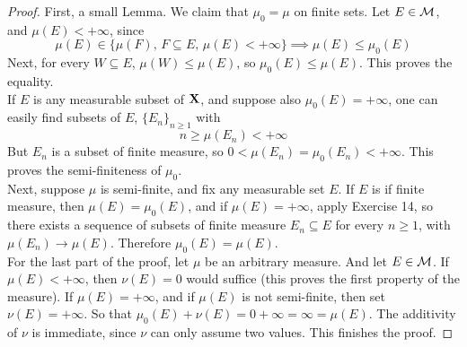 \documentclass[../../main.tex]{subfiles}
\begin{document}
\begin{proof}
First, a small Lemma. We claim that $\mu_0 = \mu$ on finite sets. Let $E\in\mathcal{M}$, and $\mu(E)<+\infty$, since \[\mu(E)\in\{\mu(F),\, F\subseteq E,\,\mu(E)<+\infty\}\implies \mu(E)\leq \mu_0(E)\]
Next, for every $W\subseteq E$, $\mu(W)\leq \mu(E)$, so $\mu_0(E)\leq \mu(E)$. This proves the equality.\\

If $E$ is any measurable subset of $\mathbf{X}$, and suppose also $\mu_0(E)=+\infty$,  one can easily find subsets of $E$, $\{E_n\}_{n\geq 1}$ with\[n\geq \mu(E_n)<+\infty\]
But $E_n$ is a subset of finite measure, so $0<\mu(E_n)=\mu_0(E_n)<+\infty$. This proves the semi-finiteness of $\mu_0$.\\

Next, suppose $\mu$ is semi-finite, and fix any measurable set $E$. If $E$ is if finite measure, then $\mu(E)=\mu_0(E)$, and if $\mu(E)=+\infty$, apply Exercise 14, so there exists a sequence of subsets of finite measure $E_n\subseteq E$ for every $n\geq 1$, with $\mu(E_n)\to \mu(E)$. Therefore $\mu_0(E)=\mu(E)$.\\

For the last part of the proof, let $\mu$ be an arbitrary measure. And let $E\in\mathcal{M}$. If $\mu(E)<+\infty$, then $\nu(E)=0$ would suffice (this proves the first property of the measure). If $\mu(E)=+\infty$, and if $\mu(E)$ is not semi-finite, then set $\nu(E)=+\infty$. So that $\mu_0(E)+\nu(E)=0 + \infty = \infty = \mu(E)$. The additivity of $\nu$ is immediate, since $\nu$ can only assume two values. This finishes the proof.
\end{proof}
\end{document}
